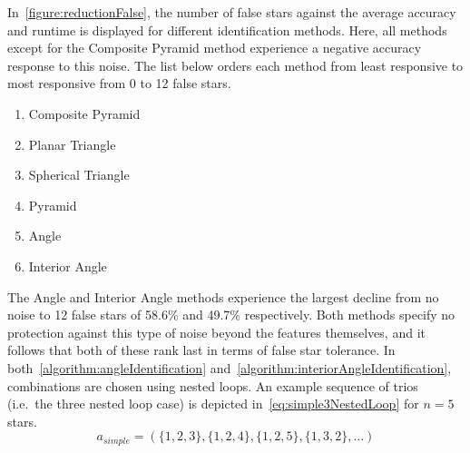 \begin{figure}
\end{figure}

In~\autoref{figure:reductionFalse}, the number of false stars against the average accuracy and runtime is displayed
for different identification methods.
Here, all methods except for the Composite Pyramid method experience a negative accuracy response to this noise.
The list below orders each method from least responsive to most responsive from 0 to 12 false stars.
\begin{multicols}{2}
    \begin{enumerate}
        \item Composite Pyramid
        \item Planar Triangle
        \item Spherical Triangle
        \item Pyramid
        \item Angle
        \item Interior Angle
    \end{enumerate}
\end{multicols}

The Angle and Interior Angle methods experience the largest decline from no noise to 12 false stars of 58.6\% and 49.7\%
respectively.
Both methods specify no protection against this type of noise beyond the features themselves, and it follows that
both of these rank last in terms of false star tolerance.
In both~\autoref{algorithm:angleIdentification} and~\autoref{algorithm:interiorAngleIdentification}, combinations are chosen
using nested loops.
An example sequence of trios (i.e.\ the three nested loop case) is depicted in~\autoref{eq:simple3NestedLoop} for
$n = 5$ stars.
\begin{equation}\label{eq:simple3NestedLoop}
a_{simple} = ( \{1,2,3\}, \{1,2,4\}, \{1,2,5\}, \{1,3,2\}, \ldots )
\end{equation}

